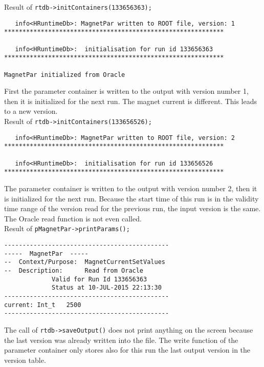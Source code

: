 Result of \verb+rtdb->initContainers(133656363);+
\begin{lstlisting}
   info<HRuntimeDb>: MagnetPar written to ROOT file, version: 1
************************************************************

   info<HRuntimeDb>:  initialisation for run id 133656363
************************************************************

MagnetPar initialized from Oracle
\end{lstlisting}
First the parameter container is written to the output with version number 1, then it is initialized for the next run. 
The magnet current is different. This leads to a new version.\\ 

Result of \verb+rtdb->initContainers(133656526);+
\begin{lstlisting}
   info<HRuntimeDb>: MagnetPar written to ROOT file, version: 2
************************************************************

   info<HRuntimeDb>:  initialisation for run id 133656526
************************************************************
\end{lstlisting}
The parameter container is written to the output with version number 2, then it is initialized for the next run. Because 
the start time of this run is in the validity time range of the version read for the previous run, the input version 
is the same. The Oracle read function is not even called.\\

Result of \verb+pMagnetPar->printParams();+
\begin{lstlisting}
---------------------------------------------
-----  MagnetPar  -----
--  Context/Purpose:  MagnetCurrentSetValues
--  Description:      Read from Oracle
             Valid for Run Id 133656363
             Status at 10-JUL-2015 22:13:30
---------------------------------------------
current: Int_t   2500 
---------------------------------------------
\end{lstlisting}

The call of \verb+rtdb->saveOutput()+ does not print anything on the screen because the last version was already written 
into the file. The write function of the parameter container only stores also for this run the last output version in the version table.\\ 

